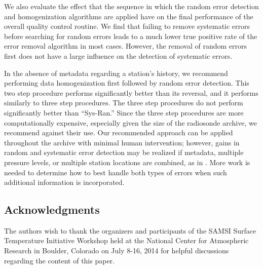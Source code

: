 \documentclass[12pt]{article}
\begin{document}
\begin{doublespacing}
We also evaluate the effect that the sequence in which the random error detection and homogenization algorithms are applied have on the final performance of the overall quality control routine.  We find that failing to remove systematic errors before searching for random errors leads to a much lower true positive rate of the error removal algorithm in most cases.  However,  the removal of random errors first does not have a large influence on the detection of systematic errors.

In the absence of metadata regarding a station's history, we recommend performing data homogenization first followed by random error detection.  This two step procedure performs significantly better than its reversal, and it performs similarly to three step procedures.  The three step procedures do not perform significantly better than ``Sys-Ran.''  Since the three step procedures are more computationally expensive, especially given the size of the radiosonde archive, we recommend against their use.  Our recommended approach can be applied throughout the archive with minimal human intervention;   however, gains in random and systematic error detection may be realized if metadata, multiple pressure levels, or multiple station locations are combined, as in \cite{ignaccolo14}.  More work is needed to determine how to best handle both types of errors  when such additional information is incorporated.   

\subsection*{Acknowledgments} The authors wish to thank the organizers and participants of the SAMSI Surface Temperature Initiative Workshop held at the National Center for Atmospheric Research in Boulder, Colorado on July 8-16, 2014 for helpful discussions regarding the content of this paper.

\end{doublespacing}





\end{document}
